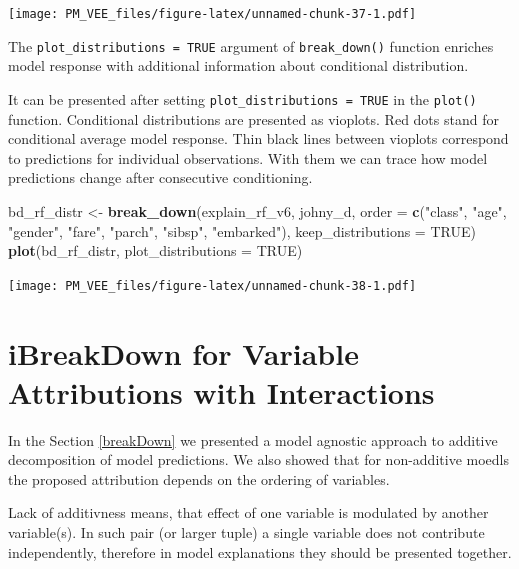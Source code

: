\documentclass[12pt,]{krantz}
\newenvironment{Shaded}{\begin{snugshade}}{\end{snugshade}}
\newcommand{\DataTypeTok}[1]{\textcolor[rgb]{0.13,0.29,0.53}{#1}}
\newcommand{\KeywordTok}[1]{\textcolor[rgb]{0.13,0.29,0.53}{\textbf{#1}}}
\newcommand{\NormalTok}[1]{#1}
\newcommand{\OtherTok}[1]{\textcolor[rgb]{0.56,0.35,0.01}{#1}}
\newcommand{\StringTok}[1]{\textcolor[rgb]{0.31,0.60,0.02}{#1}}
\theoremstyle{definition}
\theoremstyle{definition}
\theoremstyle{definition}
\theoremstyle{remark}
\begin{document}
\texttt{[image: PM\_VEE\_files/figure-latex/unnamed-chunk-37-1.pdf]}

The \texttt{plot\_distributions\ =\ TRUE} argument of
\texttt{break\_down()} function enriches model response with additional
information about conditional distribution.

It can be presented after setting \texttt{plot\_distributions\ =\ TRUE}
in the \texttt{plot()} function. Conditional distributions are presented
as vioplots. Red dots stand for conditional average model response. Thin
black lines between vioplots correspond to predictions for individual
observations. With them we can trace how model predictions change after
consecutive conditioning.

\begin{Shaded}
\begin{Highlighting}[]
\NormalTok{bd_rf_distr <-}\StringTok{ }\KeywordTok{break_down}\NormalTok{(explain_rf_v6,}
\NormalTok{                 johny_d,}
                 \DataTypeTok{order =} \KeywordTok{c}\NormalTok{(}\StringTok{"class"}\NormalTok{, }\StringTok{"age"}\NormalTok{, }\StringTok{"gender"}\NormalTok{, }\StringTok{"fare"}\NormalTok{, }\StringTok{"parch"}\NormalTok{, }\StringTok{"sibsp"}\NormalTok{, }\StringTok{"embarked"}\NormalTok{),}
                 \DataTypeTok{keep_distributions =} \OtherTok{TRUE}\NormalTok{)}
\KeywordTok{plot}\NormalTok{(bd_rf_distr, }\DataTypeTok{plot_distributions =} \OtherTok{TRUE}\NormalTok{) }
\end{Highlighting}
\end{Shaded}

\texttt{[image: PM\_VEE\_files/figure-latex/unnamed-chunk-38-1.pdf]}

\hypertarget{iBreakDown}{%
\section{iBreakDown for Variable Attributions with
Interactions}\label{iBreakDown}}

In the Section \ref{breakDown} we presented a model agnostic approach to
additive decomposition of model predictions. We also showed that for
non-additive moedls the proposed attribution depends on the ordering of
variables.

Lack of additivness means, that effect of one variable is modulated by
another variable(s). In such pair (or larger tuple) a single variable
does not contribute independently, therefore in model explanations they
should be presented together.
\end{document}
